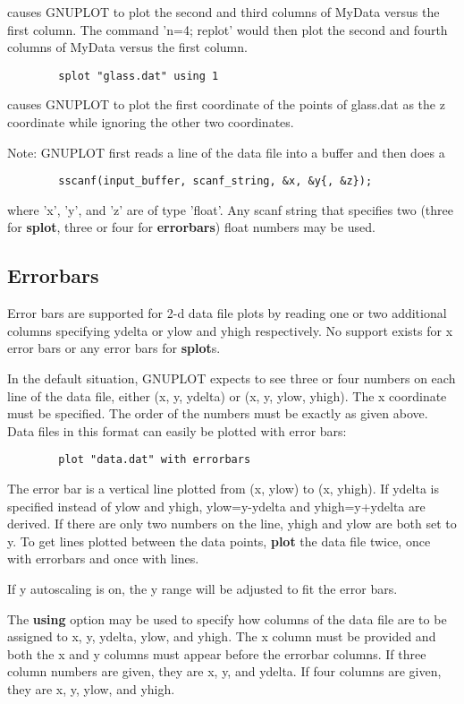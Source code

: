 causes GNUPLOT to plot the second and third columns of MyData versus
the first column. The command 'n=4; replot' would then plot the second
and fourth columns of MyData versus the first column.

\begin{verbatim}
        splot "glass.dat" using 1
\end{verbatim}

causes GNUPLOT to plot the first coordinate of the points of glass.dat
as the z coordinate while ignoring the other two coordinates.

Note: GNUPLOT first reads a line of the data file into a buffer and 
then does a 
\begin{verbatim}
        sscanf(input_buffer, scanf_string, &x, &y{, &z});
\end{verbatim}
where 'x', 'y', and 'z' are of type 'float'. Any scanf string that
specifies two (three for {\bf splot}, three or four for {\bf errorbars}) float
numbers may be used.
\subsection{Errorbars}
Error bars are supported for 2-d data file plots by reading one or
two additional columns specifying ydelta or ylow and yhigh
respectively. No support exists for x error bars or any error bars
for {\bf splot}s.

In the default situation, GNUPLOT expects to see three or four
numbers on each line of the data file, either (x, y, ydelta) or 
(x, y, ylow, yhigh). The x coordinate must be specified. The order
of the numbers must be exactly as given above. Data files in this
format can easily be plotted with error bars:

\begin{verbatim}
        plot "data.dat" with errorbars
\end{verbatim}

The error bar is a vertical line plotted from (x, ylow) to (x,
yhigh). If ydelta is specified instead of ylow and yhigh, 
ylow=y-ydelta and yhigh=y+ydelta are derived. If there
are only two numbers on the line, yhigh and ylow are both set to
y. To get lines plotted between the data points, {\bf plot} the
data file twice, once with errorbars and once with lines.

If y autoscaling is on, the y range will be adjusted to fit the
error bars.

The {\bf using} option may be used to specify how columns of the data file
are to be assigned to x, y, ydelta, ylow, and yhigh. The x column must
be provided and both the x and y columns must appear before the
errorbar columns. If three column numbers are given, they are x, y,
and ydelta. If four columns are given, they are x, y, ylow, and
yhigh.

